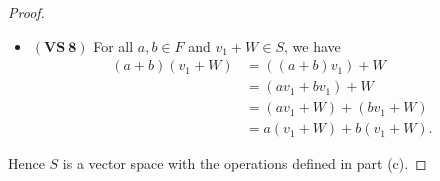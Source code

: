 \begin{Exercise}
\begin{enumerate}[(a)]
\begin{proof}
\begin{itemize}
\item $\mathbf{(VS\ 8)}$
For all $a,b\in F$ and $v_1+W\in S$, we have
\begin{align*}
(a+b)(v_1+W)
&= ((a+b)v_1) + W \\
&= (a v_1 + b v_1) + W \\
&= (a v_1 + W) + (b v_1 + W) \\
&= a(v_1+W) + b(v_1+W).
\end{align*}
\end{itemize}
Hence $S$ is a vector space with the operations defined in part (c).
\end{proof}
\end{enumerate}
\end{Exercise}